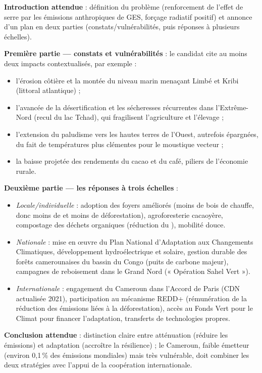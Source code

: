 \documentclass[11pt]{article}
\begin{document}
\begin{corrige}
\textbf{Introduction attendue} : définition du problème (renforcement de l'effet de serre par les émissions anthropiques de GES, forçage radiatif positif) et annonce d'un plan en deux parties (constats/vulnérabilités, puis réponses à plusieurs échelles).

\textbf{Première partie — constats et vulnérabilités} : le candidat cite au moins deux impacts contextualisés, par exemple :
\begin{itemize}
    \item l'érosion côtière et la montée du niveau marin menaçant Limbé et Kribi (littoral atlantique) ;
    \item l'avancée de la désertification et les sécheresses récurrentes dans l'Extrême-Nord (recul du lac Tchad), qui fragilisent l'agriculture et l'élevage ;
    \item l'extension du paludisme vers les hautes terres de l'Ouest, autrefois épargnées, du fait de températures plus clémentes pour le moustique vecteur ;
    \item la baisse projetée des rendements du cacao et du café, piliers de l'économie rurale.
\end{itemize}

\textbf{Deuxième partie — les réponses à trois échelles} :
\begin{itemize}
    \item \emph{Locale/individuelle} : adoption des foyers améliorés (moins de bois de chauffe, donc moins de  et moins de déforestation), agroforesterie cacaoyère, compostage des déchets organiques (réduction du ), mobilité douce.
    \item \emph{Nationale} : mise en œuvre du Plan National d'Adaptation aux Changements Climatiques, développement hydroélectrique et solaire, gestion durable des forêts camerounaises du bassin du Congo (puits de carbone majeur), campagnes de reboisement dans le Grand Nord (« Opération Sahel Vert »).
    \item \emph{Internationale} : engagement du Cameroun dans l'Accord de Paris (CDN actualisée 2021), participation au mécanisme REDD+ (rémunération de la réduction des émissions liées à la déforestation), accès au Fonds Vert pour le Climat pour financer l'adaptation, transferts de technologies propres.
\end{itemize}

\textbf{Conclusion attendue} : distinction claire entre atténuation (réduire les émissions) et adaptation (accroître la résilience) ; le Cameroun, faible émetteur (environ 0,1\,\% des émissions mondiales) mais très vulnérable, doit combiner les deux stratégies avec l'appui de la coopération internationale.


\end{corrige}
\end{document}

